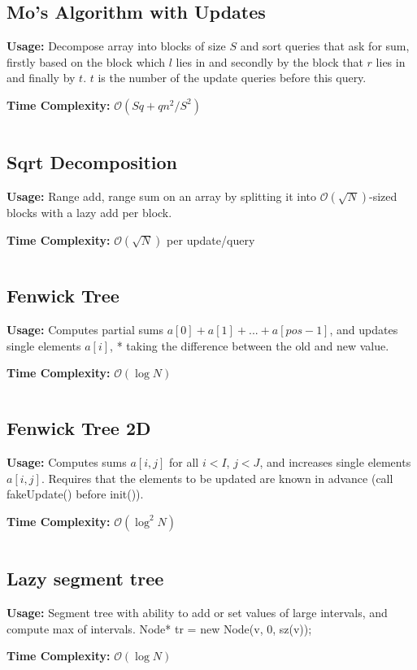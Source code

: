   \subsection{Mo's Algorithm with Updates}
    \par \textbf{Usage:} Decompose array into blocks of size $S$ and sort queries that ask for sum, firstly based on the block which $l$ lies in and secondly by the block that $r$ lies in and finally by $t$. $t$ is the number of the update queries before this query.
    \par \textbf{Time Complexity:} $\mathcal{O}(S q + qn^2 /S^2)$
    \inputminted{cpp}{library/structures/mo_with_updates.cpp}

  \subsection{Sqrt Decomposition}
    \par \textbf{Usage:} Range add, range sum on an array by splitting it into $\mathcal{O}(\sqrt N)$-sized blocks with a lazy add per block.
    \par \textbf{Time Complexity:} $\mathcal{O}(\sqrt N)$ per update/query
    \inputminted{cpp}{library/structures/sqrt_decomp.cpp}

  \subsection{Fenwick Tree}
    \par \textbf{Usage:}  Computes partial sums $a[0] + a[1] + ... + a[pos - 1]$, and updates single elements $a[i]$,
 * taking the difference between the old and new value.
    \par \textbf{Time Complexity:} $\mathcal{O}(\log N)$
    \inputminted{cpp}{library/structures/fenwick.cpp}

  \subsection{Fenwick Tree 2D}
    \par \textbf{Usage:} Computes sums $a[i,j]$ for all $i<I$, $j<J$, and increases single elements $a[i,j]$.
    Requires that the elements to be updated are known in advance (call fakeUpdate() before init()).
    \par \textbf{Time Complexity:} $\mathcal{O}(\log^2 N)$
    \inputminted{cpp}{library/structures/fenwick2d.cpp}

  \subsection{Lazy segment tree}
    \par \textbf{Usage:} Segment tree with ability to add or set values of large intervals, and compute max of intervals.
    Node* tr = new Node(v, 0, sz(v));
    \par \textbf{Time Complexity:} $\mathcal{O}(\log N)$
    \inputminted{cpp}{library/structures/lazytree.cpp}


